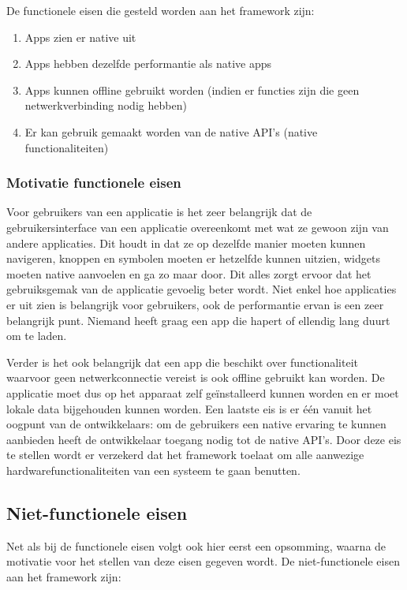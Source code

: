 De functionele eisen die gesteld worden aan het framework zijn:

\begin{enumerate}
    \item Apps zien er native uit
    \item Apps hebben dezelfde performantie als native apps
    \item Apps kunnen offline gebruikt worden (indien er functies zijn die geen netwerkverbinding nodig hebben)
    \item Er kan gebruik gemaakt worden van de native API's (native functionaliteiten)
\end{enumerate}

\subsubsection{Motivatie functionele eisen}
\label{subsubsec:MotivatieFunctioneleEisen}

Voor gebruikers van een applicatie is het zeer belangrijk dat de gebruikersinterface van een applicatie overeenkomt met wat ze gewoon zijn van andere applicaties. Dit houdt in dat ze op dezelfde manier moeten kunnen navigeren, knoppen en symbolen moeten er hetzelfde kunnen uitzien, widgets moeten native aanvoelen en ga zo maar door. Dit alles zorgt ervoor dat het gebruiksgemak van de applicatie gevoelig beter wordt. Niet enkel hoe applicaties er uit zien is belangrijk voor gebruikers, ook de performantie ervan is een zeer belangrijk punt. Niemand heeft graag een app die hapert of ellendig lang duurt om te laden. 

Verder is het ook belangrijk dat een app die beschikt over functionaliteit waarvoor geen netwerkconnectie vereist is ook offline gebruikt kan worden. De applicatie moet dus op het apparaat zelf geïnstalleerd kunnen worden en er moet lokale data bijgehouden kunnen worden. Een laatste eis is er één vanuit het oogpunt van de ontwikkelaars: om de gebruikers een native ervaring te kunnen aanbieden heeft de ontwikkelaar toegang nodig tot de native API's. Door deze eis te stellen wordt er verzekerd dat het framework toelaat om alle aanwezige hardwarefunctionaliteiten van een systeem te gaan benutten.

\subsection{Niet-functionele eisen}
\label{subsec:nietFunctioneleEisen}

Net als bij de functionele eisen volgt ook hier eerst een opsomming, waarna de motivatie voor het stellen van deze eisen gegeven wordt. De niet-functionele eisen aan het framework zijn:

